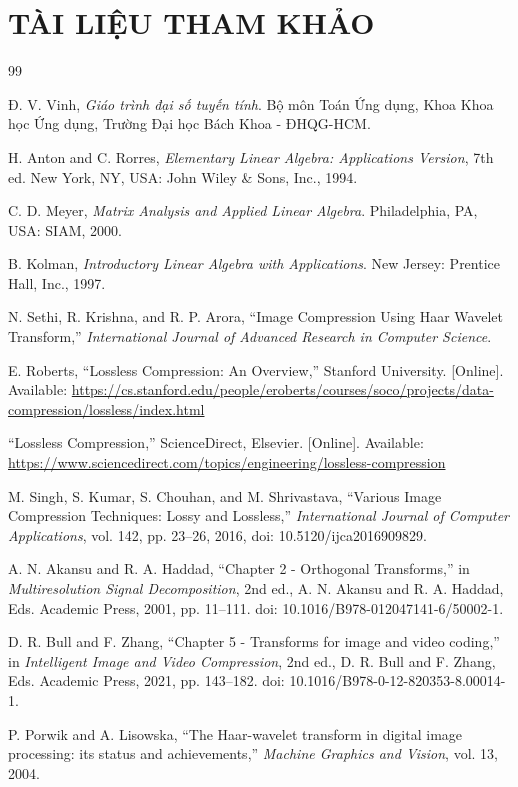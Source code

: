 \section*{TÀI LIỆU THAM KHẢO}

\begin{thebibliography}{99}

Đ. V. Vinh, \textit{Giáo trình đại số tuyến tính}. Bộ môn Toán Ứng dụng, Khoa Khoa học Ứng dụng, Trường Đại học Bách Khoa - ĐHQG-HCM.

H. Anton and C. Rorres, \textit{Elementary Linear Algebra: Applications Version}, 7th ed. New York, NY, USA: John Wiley \& Sons, Inc., 1994.

C. D. Meyer, \textit{Matrix Analysis and Applied Linear Algebra}. Philadelphia, PA, USA: SIAM, 2000.

B. Kolman, \textit{Introductory Linear Algebra with Applications}. New Jersey: Prentice Hall, Inc., 1997.

N. Sethi, R. Krishna, and R. P. Arora, ``Image Compression Using Haar Wavelet Transform,'' \textit{International Journal of Advanced Research in Computer Science}.


E. Roberts, ``Lossless Compression: An Overview,'' Stanford University. [Online]. Available: \url{https://cs.stanford.edu/people/eroberts/courses/soco/projects/data-compression/lossless/index.html}

``Lossless Compression,'' ScienceDirect, Elsevier. [Online]. Available: \url{https://www.sciencedirect.com/topics/engineering/lossless-compression}

M. Singh, S. Kumar, S. Chouhan, and M. Shrivastava, ``Various Image Compression Techniques: Lossy and Lossless,'' \textit{International Journal of Computer Applications}, vol. 142, pp. 23--26, 2016, doi: 10.5120/ijca2016909829.

A. N. Akansu and R. A. Haddad, ``Chapter 2 - Orthogonal Transforms,'' in \textit{Multiresolution Signal Decomposition}, 2nd ed., A. N. Akansu and R. A. Haddad, Eds. Academic Press, 2001, pp. 11--111. doi: 10.1016/B978-012047141-6/50002-1.

D. R. Bull and F. Zhang, ``Chapter 5 - Transforms for image and video coding,'' in \textit{Intelligent Image and Video Compression}, 2nd ed., D. R. Bull and F. Zhang, Eds. Academic Press, 2021, pp. 143--182. doi: 10.1016/B978-0-12-820353-8.00014-1.

P. Porwik and A. Lisowska, ``The Haar-wavelet transform in digital image processing: its status and achievements,'' \textit{Machine Graphics and Vision}, vol. 13, 2004.
\end{thebibliography}